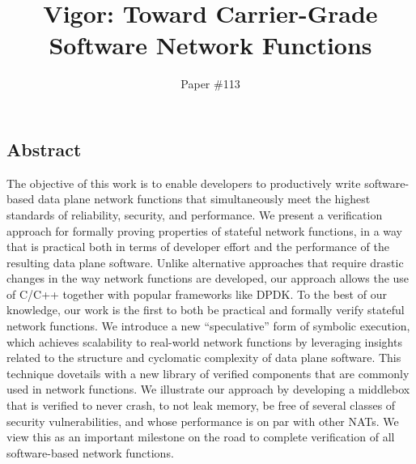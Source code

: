 \documentclass[letterpaper,twocolumn,10pt]{article}
\begin{document}
\date{}

\title{\Large \bf Vigor: Toward Carrier-Grade Software Network Functions}

\author{
    {\rm Paper \#113}\\
}

\maketitle

\thispagestyle{empty}


\subsection*{Abstract}
The objective of this work is to enable developers to productively write software-based data plane network functions that simultaneously meet the highest standards of reliability, security, and performance. We present a verification approach for formally proving properties of stateful network functions, in a way that is practical both in terms of developer effort and the performance of the resulting data plane software. Unlike alternative approaches that require drastic changes in the way network functions are developed, our approach allows the use of C/C++ together with popular frameworks like DPDK. To the best of our knowledge, our work is the first to both be practical and formally verify stateful network functions. We introduce a new ``speculative'' form of symbolic execution, which achieves scalability to real-world network functions by leveraging insights related to the structure and cyclomatic complexity of data plane software. This technique dovetails with a new library of verified components that are commonly used in network functions. We illustrate our approach by developing a middlebox that is verified to never crash, to not leak memory, be free of several classes of security vulnerabilities, and whose performance is on par with other NATs. %
We view this as an important milestone on the road to complete verification of all software-based network functions.
\end{document}
